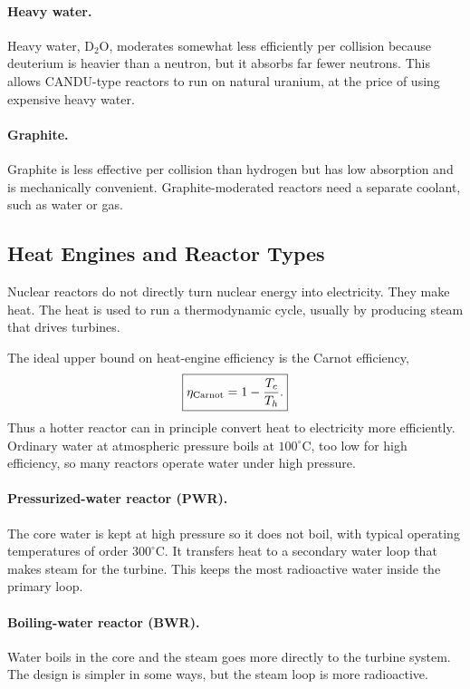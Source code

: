 \paragraph{Heavy water.}
Heavy water, $\mathrm{D_2O}$, moderates somewhat less efficiently per collision
because deuterium is heavier than a neutron, but it absorbs far fewer neutrons.
This allows CANDU-type reactors to run on natural uranium, at the price of using
expensive heavy water.

\paragraph{Graphite.}
Graphite is less effective per collision than hydrogen but has low absorption and
is mechanically convenient. Graphite-moderated reactors need a separate coolant,
such as water or gas.

\subsection{Heat Engines and Reactor Types}
\label{subsec:lec11:reactor_types}

Nuclear reactors do not directly turn nuclear energy into electricity. They make
heat. The heat is used to run a thermodynamic cycle, usually by producing steam
that drives turbines.

The ideal upper bound on heat-engine efficiency is the Carnot efficiency,
\begin{equation}
  \boxed{\eta_{\rm Carnot}=1-\frac{T_c}{T_h}.}
  \label{eq:lec11:carnot}
\end{equation}
Thus a hotter reactor can in principle convert heat to electricity more
efficiently. Ordinary water at atmospheric pressure boils at
$100^\circ\mathrm C$, too low for high efficiency, so many reactors operate water
under high pressure.

\paragraph{Pressurized-water reactor (PWR).}
The core water is kept at high pressure so it does not boil, with typical
operating temperatures of order $300^\circ\mathrm C$. It transfers heat to a
secondary water loop that makes steam for the turbine. This keeps the most
radioactive water inside the primary loop.

\paragraph{Boiling-water reactor (BWR).}
Water boils in the core and the steam goes more directly to the turbine system.
The design is simpler in some ways, but the steam loop is more radioactive.


